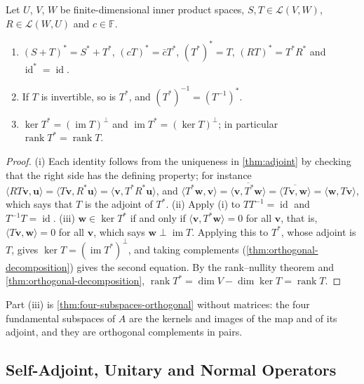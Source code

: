\begin{proposition}
\label{prop:adjoint-rules}
Let $U$, $V$, $W$ be finite-dimensional inner product spaces, $S,T\in\mathcal L(V,W)$, $R\in\mathcal L(W,U)$ and $c\in\mathbb F$.
\begin{enumerate}
\item $(S+T)^*=S^*+T^*$, $(cT)^*=\bar cT^*$, $(T^*)^*=T$, $(RT)^*=T^*R^*$ and $\operatorname{id}^*=\operatorname{id}$.
\item If $T$ is invertible, so is $T^*$, and $(T^*)^{-1}=(T^{-1})^*$.
\item $\ker T^*=(\operatorname{im}T)^\perp$ and $\operatorname{im}T^*=(\ker T)^\perp$; in particular $\operatorname{rank}T^*=\operatorname{rank}T$.
\end{enumerate}
\end{proposition}

\begin{proof}
(i) Each identity follows from the uniqueness in \cref{thm:adjoint} by checking that the right side has the defining property; for instance $\langle RT\mathbf v,\mathbf u\rangle=\langle T\mathbf v,R^*\mathbf u\rangle=\langle\mathbf v,T^*R^*\mathbf u\rangle$, and $\langle T^*\mathbf w,\mathbf v\rangle=\overline{\langle\mathbf v,T^*\mathbf w\rangle}=\overline{\langle T\mathbf v,\mathbf w\rangle}=\langle\mathbf w,T\mathbf v\rangle$, which says that $T$ is the adjoint of $T^*$. (ii) Apply (i) to $TT^{-1}=\operatorname{id}$ and $T^{-1}T=\operatorname{id}$. (iii) $\mathbf w\in\ker T^*$ if and only if $\langle\mathbf v,T^*\mathbf w\rangle=0$ for all $\mathbf v$, that is, $\langle T\mathbf v,\mathbf w\rangle=0$ for all $\mathbf v$, which says $\mathbf w\perp\operatorname{im}T$. Applying this to $T^*$, whose adjoint is $T$, gives $\ker T=(\operatorname{im}T^*)^\perp$, and taking complements (\cref{thm:orthogonal-decomposition}) gives the second equation. By the rank--nullity theorem and \cref{thm:orthogonal-decomposition}, $\operatorname{rank}T^*=\dim V-\dim\ker T=\operatorname{rank}T$.
\end{proof}

Part (iii) is \cref{thm:four-subspaces-orthogonal} without matrices: the four fundamental subspaces of $A$ are the kernels and images of the map and of its adjoint, and they are orthogonal complements in pairs.

\subsection{Self-Adjoint, Unitary and Normal Operators}

